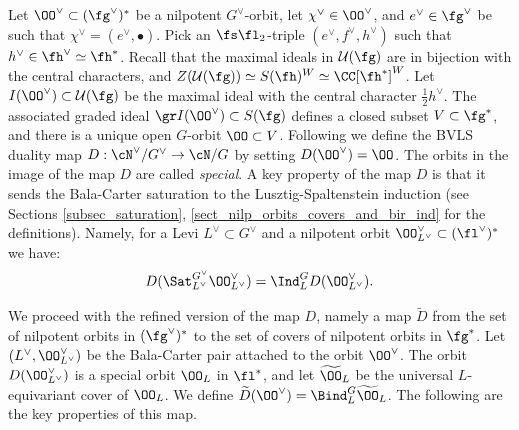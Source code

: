 \documentclass[12pt]{amsart}
\begin{document}
    Let $\OO^\vee\subset (\fg^\vee)^*$ be a nilpotent $G^\vee$-orbit, let $\chi^\vee\in \OO^\vee$, and $e^\vee\in \fg^\vee$ be such that $\chi^\vee=(e^\vee, \bullet)$. Pick an $\fs\fl_2$-triple $(e^\vee, f^\vee, h^\vee)$ such that $h^\vee\in \fh^\vee\simeq \fh^*$. Recall that the maximal ideals in $\mathcal{U}(\fg)$ are in bijection with the central characters, and $Z(\mathcal{U}(\fg))\simeq S(\fh)^W\simeq \CC[\fh^*]^{W}$. Let $I(\OO^\vee)\subset \mathcal{U}(\fg)$ be the maximal ideal with the central character $\frac{1}{2}h^\vee$. The associated graded ideal $\gr I(\OO^\vee)\subset S(\fg)$ defines a closed subset $V\subset \fg^*$, and there is a unique open $G$-orbit $\OO\subset V$. Following \cite{BarbaschVogan1985} we define the BVLS duality map $D: \cN^\vee/G^\vee \to \cN/G$ by setting $D(\OO^\vee)=\OO$. The orbits in the image of the map $D$ are called \emph{special}. A key property of the map $D$ is that it sends the Bala-Carter saturation to the Lusztig-Spaltenstein induction (see Sections \ref{subsec_saturation}, \ref{sect_nilp_orbits_covers_and_bir_ind} for the definitions). Namely, for a Levi $L^\vee\subset G^\vee$ and a nilpotent orbit $\OO_{L^\vee}^\vee\subset (\fl^\vee)^*$ we have:
    \begin{equation*}
    D(\Sat_{L^\vee}^{G^\vee} \OO_{L^\vee}^\vee)=\Ind_L^G D(\OO_{L^\vee}^\vee).
    \end{equation*}

    We proceed with the refined version of the map $D$, namely a map $\widetilde{D}$ from the set of nilpotent orbits in $(\fg^\vee)^*$ to the set of covers of nilpotent orbits in $\fg^*$. Let $(L^\vee, \OO_{L^\vee}^\vee)$ be the Bala-Carter pair attached to the orbit $\OO^\vee$. The orbit $D(\OO^\vee_{L^\vee})$ is a special orbit $\OO_L$ in $\fl^*$, and let $\widetilde{\OO}_L$ be the universal $L$-equivariant cover of $\OO_L$. We define $\widetilde{D}(\OO^\vee)=\Bind_L^G \widetilde{\OO}_L$. The following are the key properties of this map.
\end{document}

